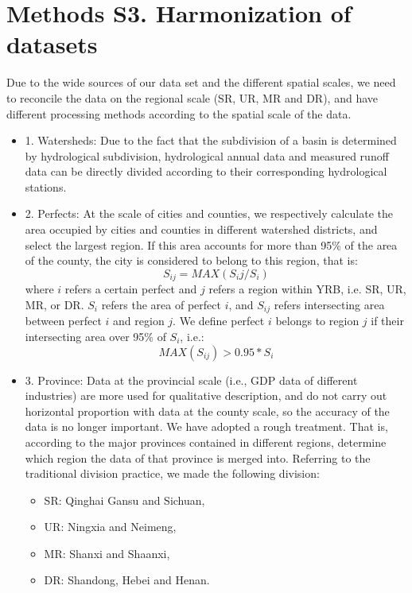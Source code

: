 \documentclass[9pt,twoside,lineno]{pnas-new}
\begin{document}
\section*{Methods S3. Harmonization of datasets}
Due to the wide sources of our data set and the different spatial scales, we need to reconcile the data on the regional scale (SR, UR, MR and DR), and have different processing methods according to the spatial scale of the data.
\begin{itemize}
    \item 1. Watersheds:
        Due to the fact that the subdivision of a basin is determined by hydrological subdivision, hydrological annual data and measured runoff data can be directly divided according to their corresponding hydrological stations.
    \item 2. Perfects:
        At the scale of cities and counties, we respectively calculate the area occupied by cities and counties in different watershed districts, and select the largest region. If this area accounts for more than 95\% of the area of the county, the city is considered to belong to this region, that is:
        $$ S_{ij} = MAX(S_ij / S_i)$$
        where $i$ refers a certain perfect and $j$ refers a region within YRB, i.e. SR, UR, MR, or DR. $S_i$ refers the area of perfect $i$, and $S_{ij}$ refers intersecting area between perfect $i$ and region $j$.
        We define perfect $i$ belongs to region $j$ if their intersecting area over 95\% of $S_i$, i.e.:
        $$ MAX(S_{ij}) > 0.95 * S_i $$
    \item 3. Province:
    Data at the provincial scale (i.e., GDP data of different industries) are more used for qualitative description, and do not carry out horizontal proportion with data at the county scale, so the accuracy of the data is no longer important. We have adopted a rough treatment. That is, according to the major provinces contained in different regions, determine which region the data of that province is merged into. Referring to the traditional division practice, we made the following division:
    \begin{itemize}
        \item SR: Qinghai Gansu and Sichuan,
        \item UR: Ningxia and Neimeng,
        \item MR: Shanxi and Shaanxi,
        \item DR: Shandong, Hebei and Henan.
    \end{itemize}
\end{itemize}
\end{document}
